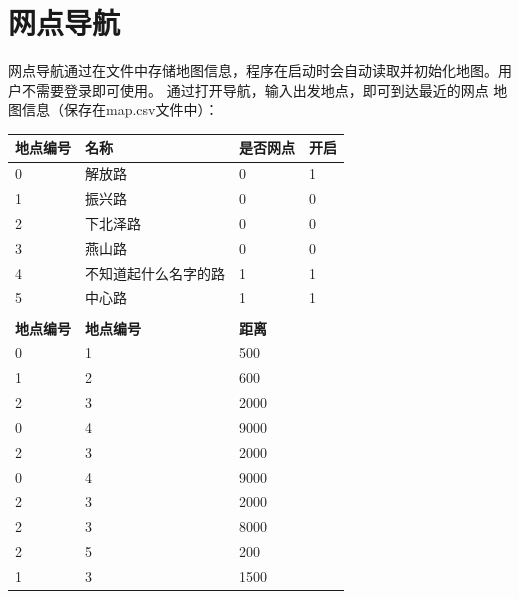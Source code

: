 \documentclass{ctexrep}
\begin{document}
\section{网点导航}
网点导航通过在文件中存储地图信息，程序在启动时会自动读取并初始化地图。用户不需要登录即可使用。
通过打开导航，输入出发地点，即可到达最近的网点
地图信息（保存在map.csv文件中）：
\begin{center}
  \begin{tabular}{p{2.5cm} p{2.5cm} p{2.5cm} p{2.5cm}}
    \hline \textbf{地点编号} & \textbf{名称}        & \textbf{是否网点} & \textbf{开启} \\
    \hline 0                 & 解放路               & 0                 & 1             \\
    1                        & 振兴路               & 0                 & 0             \\
    2                        & 下北泽路             & 0                 & 0             \\
    3                        & 燕山路               & 0                 & 0             \\
    4                        & 不知道起什么名字的路 & 1                 & 1             \\
    5                        & 中心路               & 1                 & 1             \\
    \\
    \hline \textbf{地点编号} & \textbf{地点编号}    & \textbf{距离}                     \\
    \hline 0                 & 1                    & 500                               \\
    1                        & 2                    & 600                               \\
    2                        & 3                    & 2000                              \\
    0                        & 4                    & 9000                              \\
    2                        & 3                    & 2000                              \\
    0                        & 4                    & 9000                              \\
    2                        & 3                    & 2000                              \\
    2                        & 3                    & 8000                              \\
    2                        & 5                    & 200                               \\
    1                        & 3                    & 1500
  \end{tabular}
\end{center}
\end{document}
